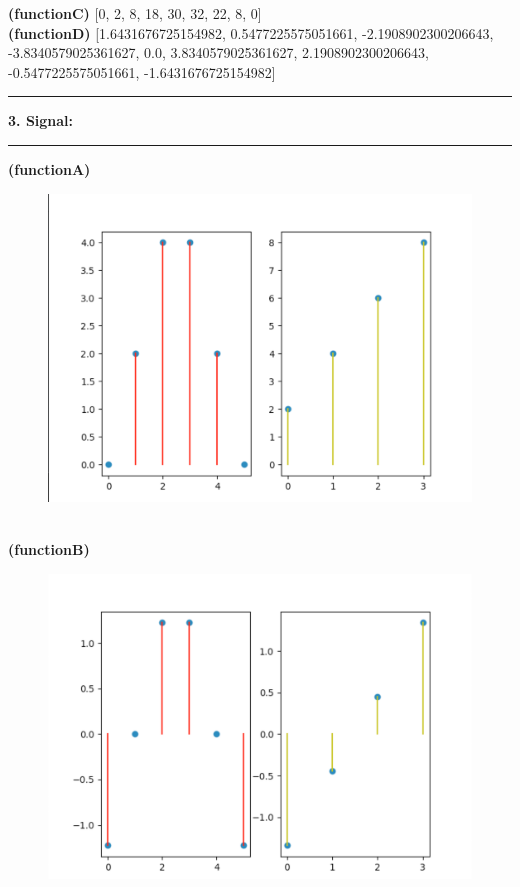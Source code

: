 \documentclass[11pt]{article}
\newcommand\question[2]{\vspace{.25in}\hrule\textbf{#1: #2}\vspace{.5em}\hrule\vspace{.10in}}
\renewcommand\part[1]{\vspace{.10in}\textbf{(#1)}}
\begin{document}
     \part{functionC} [0, 2, 8, 18, 30, 32, 22, 8, 0]\\
     \part{functionD} [1.6431676725154982, 0.5477225575051661, -2.1908902300206643, -3.8340579025361627, 0.0, 3.8340579025361627, 2.1908902300206643, -0.5477225575051661, -1.6431676725154982]\\
     \cleardoublepage
     
      \question{3. Signal}{}
     \part{functionA}
     \begin{figure}[h]
         \centering
         \includegraphics[width=0.5\linewidth]{figures/3a.png}
         \label{fig:3a}
     \end{figure}\\
     \part{functionB}
     \begin{figure}[h]
         \centering
         \includegraphics[width=0.5\linewidth]{figures/3b.png}
         \label{fig:3b}
     \end{figure}\\
\end{document}
